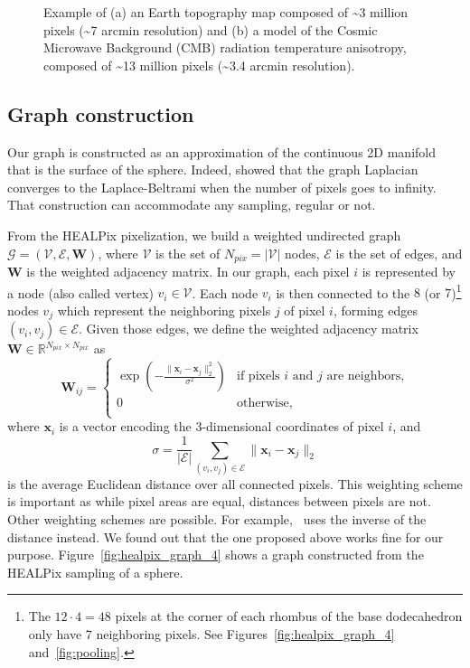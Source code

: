 \documentclass[final,twocolumn,3p,times,authoryear]{elsarticle}
\newcommand{\figref}[1]{Figure~\ref{fig:#1}}
\renewcommand{\b}[1]{{\bm{#1}}}   %
\newcommand{\1}{\b{1}}              %
\newcommand{\0}{\b{0}}              %
\newcommand{\G}{\mathcal{G}}
\newcommand{\V}{\mathcal{V}}
\newcommand{\E}{\mathcal{E}}
\newcommand{\W}{\b{W}}
\newcommand{\x}{\b{x}}
\newcommand{\R}{\mathbb{R}}
\begin{document}
\begin{figure}
\begin{subfigure}[b]{0.45\linewidth}
		\caption{}
		\label{fig:example_cmb}
	\end{subfigure}
	\caption[]{Example of (a) an Earth topography map composed of \textasciitilde 3 million pixels (\textasciitilde 7 arcmin resolution) and (b) a model of the Cosmic Microwave Background (CMB) radiation temperature anisotropy, composed of \textasciitilde 13 million pixels (\textasciitilde 3.4 arcmin resolution).\footnotemark}
	\label{fig:example_maps}
\end{figure}


\subsection{Graph construction}

Our graph is constructed as an approximation of the continuous 2D manifold that is the surface of the sphere. Indeed, \citet{belkin2007convergence} showed that the graph Laplacian converges to the Laplace-Beltrami when the number of pixels goes to infinity. That construction can accommodate any sampling, regular or not.

From the HEALPix pixelization, we build a weighted undirected graph $\G = (\V, \E, \W)$, where $\V$ is the set of $N_{pix} = |\V|$ nodes, $\E$ is the set of edges, and $\W$ is the weighted adjacency matrix. In our graph, each pixel $i$ is represented by a node (also called vertex) $v_i \in \V$. Each node $v_i$ is then connected to the $8$ (or $7$)\footnote{\label{neighbors}The $12 \cdot 4 = 48$ pixels at the corner of each rhombus of the base dodecahedron only have 7 neighboring pixels. See Figures~\ref{fig:healpix_graph_4} and~\ref{fig:pooling}.} nodes $v_j$ which represent the neighboring pixels $j$ of pixel $i$, forming edges $(v_i, v_j) \in \E$. Given those edges, we define the weighted adjacency matrix $\W \in \R^{N_{pix} \times N_{pix}}$ as
\begin{equation*}
	\W_{ij} = \begin{cases}
		\exp \left( -\frac{\|\x_i-\x_j\|_2^2}{\sigma^2} \right) & \text{if pixels $i$ and $j$ are neighbors,} \\
		0 & \text{otherwise,} \\
	\end{cases}
\end{equation*}
where $\x_i$ is a vector encoding the 3-dimensional coordinates of pixel $i$, and
\begin{equation*}
	\sigma = \frac{1}{|\E|} \sum_{(v_i, v_j) \in \E} \|\x_i-\x_j\|_2
\end{equation*}
is the average Euclidean distance over all connected pixels. This weighting scheme is important as while pixel areas are equal, distances between pixels are not.
Other weighting schemes are possible. For example,~\cite{khasanova2017graphomni} uses the inverse of the distance instead. We found out that the one proposed above works fine for our purpose.
\figref{healpix_graph_4} shows a graph constructed from the HEALPix sampling of a sphere.
\end{document}
